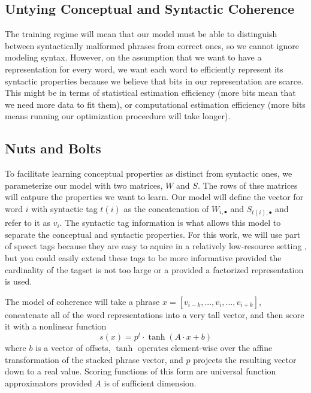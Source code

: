 \documentclass[11pt,letterpaper]{article}
\begin{document}
\subsection{Untying Conceptual and Syntactic Coherence}
The training regime will mean that our model must be able to distinguish
between syntactically malformed phrases from correct ones,
so we cannot ignore modeling syntax.
However, on the assumption that we want to have a representation
for every word, we want each word to efficiently represent its
syntactic properties because we believe that bits in our representation are scarce.
This might be in terms of statistical estimation efficiency (more bits mean that we need more data to fit them), 
or computational estimation efficiency (more bits means running our optimization proceedure will take longer).


\subsection{Nuts and Bolts}
To facilitate learning conceptual properties as distinct from syntactic ones,
we parameterize our model with two matrices, $W$ and $S$.
The rows of thse matrices will catpure the properties we want to learn.
Our model will define the vector for word $i$ with syntactic tag $t(i)$
as the concatenation of $W_{i,\bullet}$ and $S_{t(i),\bullet}$ and refer to it as $v_i$.
The syntactic tag information is what allows this model to separate the conceptual
and syntactic properties. For this work, we will use part of speect tags because
they are easy to aquire in a relatively low-resource setting \cite{pos},
but you could easily extend these tags to be more informative provided
the cardinality of the tagset is not too large or a provided a factorized representation is used.

The model of coherence will take a phrase $x = [v_{i-k}, ..., v_i, ..., v_{i+k}]$,
concatenate all of the word representations into a very tall vector, and then score it
with a nonlinear function
\[
	s(x) = p^t \cdot \tanh( A \cdot x + b )
\]
where $b$ is a vector of offsets,
$\tanh$ operates element-wise over the affine transformation of the stacked phrase vector,
and $p$ projects the resulting vector down to a real value.
Scoring functions of this form are universal function approximators
provided $A$ is of sufficient dimension\cite{Hornik:1989}.
\end{document}
